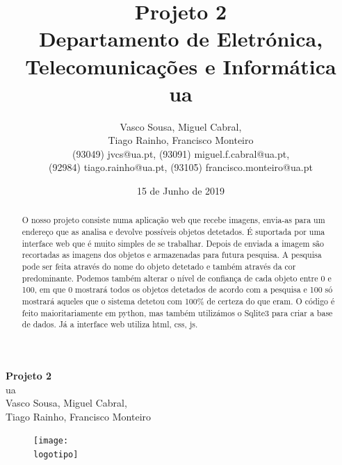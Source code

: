 \documentclass{report}
\begin{document}
%
\def\titulo{\textbf{Projeto 2}}
\def\data{15 de Junho de 2019}
\def\autores{Vasco Sousa, Miguel Cabral,\\ Tiago Rainho, Francisco Monteiro}
\def\autorescontactos{(93049) jvcs@ua.pt, (93091) miguel.f.cabral@ua.pt,\\ (92984) tiago.rainho@ua.pt, (93105) francisco.monteiro@ua.pt}

\def\departamento{Departamento de Eletrónica, Telecomunicações e Informática}
\def\empresa{\ac{ua}}
\def\logotipo{ua.pdf}

%
%
\begin{titlepage}

\begin{center}
%
\vspace*{50mm}
%
{\Huge \titulo}\\ 
%
\vspace{10mm}
%
{\Large \empresa}\\
%
\vspace{10mm}
%
{\LARGE \autores}\\ 
%
\vspace{30mm}
%
\begin{figure}[h]
\center
\texttt{[image: \\logotipo]}
\end{figure}
%
\vspace{30mm}
\end{center}
%
\begin{flushright}

\end{flushright}
\end{titlepage}

\title{%
{\Huge\textbf{\titulo}}\\
{\Large \departamento\\ \empresa}
}
%
\author{%
    \autores \\
    \autorescontactos
}
%
\date{\data}
%

\maketitle


\begin{abstract}
O nosso projeto consiste numa aplicação web que recebe imagens, envia-as para um endereço que as analisa e devolve possíveis objetos detetados. É suportada por uma interface web que é muito simples de se trabalhar. Depois de enviada a imagem são recortadas as imagens dos objetos e armazenadas para futura pesquisa. A pesquisa pode ser feita através do nome do objeto detetado e também através da cor predominante. Podemos também alterar o nível de confiança de cada objeto entre 0 e 100, em que 0 mostrará todos os objetos detetados de acordo com a pesquisa e 100 só mostrará aqueles que o sistema detetou com 100\% de certeza do que eram. O código é feito maioritariamente em python, mas também utilizámos o Sqlite3 para criar a base de dados. Já a interface web utiliza \ac{html}, \ac{css}, \ac{js}. 

\end{abstract}
\end{document}

